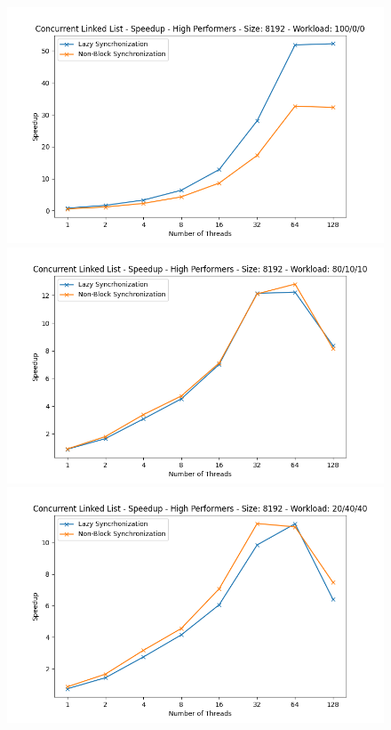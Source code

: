 \documentclass[../final_report.tex]{subfiles}
\begin{document}
\begin{figure}[H]
    \centering
        \includegraphics[scale=0.4]{outFiles/plots/concurrent_data_structs_high_speedup_8192_100_0_0.png}
        \includegraphics[scale=0.4]{outFiles/plots/concurrent_data_structs_high_speedup_8192_80_10_10.png}
        \includegraphics[scale=0.4]{outFiles/plots/concurrent_data_structs_high_speedup_8192_20_40_40.png}

\end{figure}
\end{document}
